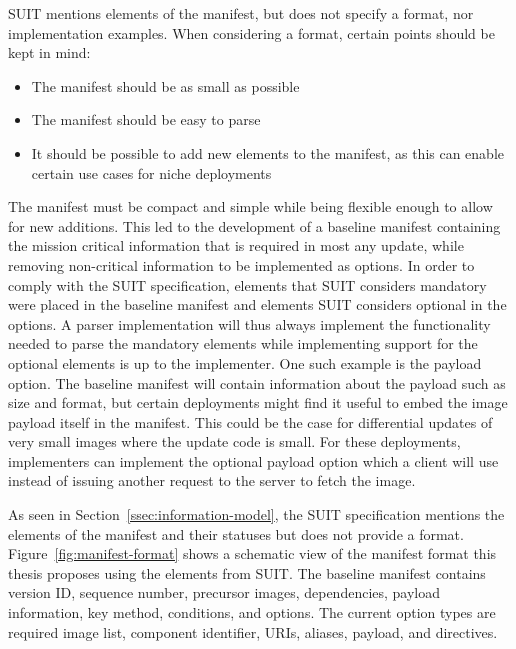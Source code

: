 \documentclass[0-thesis.tex]{subfiles}
\begin{document}
SUIT mentions elements of the manifest, but does not specify a format, nor implementation
examples. When considering a format, certain points should be kept in mind:

\begin{itemize}
        \item The manifest should be as small as possible
        \item The manifest should be easy to parse
        \item It should be possible to add new elements to the manifest, as this can
                enable certain use cases for niche deployments
\end{itemize}

The manifest must be compact and simple while being flexible enough to allow for new
additions. This led to the development of a baseline manifest containing the mission
critical information that is required in most any update, while removing non-critical
information to be implemented as options. In order to comply with the SUIT specification,
elements that SUIT considers mandatory were placed in the baseline manifest and elements
SUIT considers optional in the options. A parser implementation will thus always implement
the functionality needed to parse the mandatory elements while implementing support for
the optional elements is up to the implementer. One such example is the payload option.
The baseline manifest will contain information about the payload such as size and format,
but certain deployments might find it useful to embed the image payload itself in the
manifest. This could be the case for differential updates of very small images where the
update code is small. For these deployments, implementers can implement the optional
payload option which a client will use instead of issuing another request to the server to
fetch the image.

As seen in Section~\ref{ssec:information-model}, the SUIT specification mentions the
elements of the manifest and their statuses but does not provide a format.
Figure~\ref{fig:manifest-format} shows a schematic view of the manifest format this thesis
proposes using the elements from SUIT. The baseline manifest contains version ID, sequence
number, precursor images, dependencies, payload information, key method, conditions, and
options. The current option types are required image list, component identifier, URIs,
aliases, payload, and directives.
\end{document}

